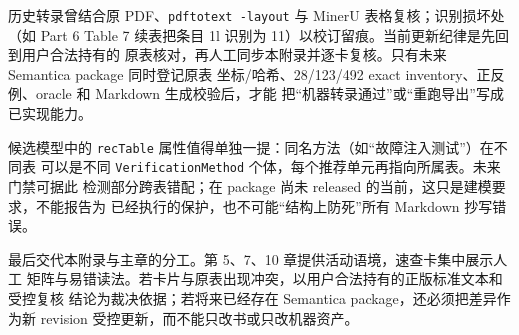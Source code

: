 历史转录曾结合原 PDF、\allowbreak{}\texttt{pdftotext \allowbreak{}-\allowbreak{}layout}\allowbreak{} 与 MinerU 表格复核；识别损坏处（如 Part 6
Table 7 续表把条目 1l 识别为 11）以校订留痕。当前更新纪律是先回到用户合法持有的
原表核对，再人工同步本附录并逐卡复核。只有未来 Semantica package 同时登记原表
坐标/哈希、28/123/492 exact inventory、正反例、oracle 和 Markdown 生成校验后，才能
把“机器转录通过”或“重跑导出”写成已实现能力。

候选模型中的 \nolinkurl{recTable} 属性值得单独一提：同名方法（如“故障注入测试”）在不同表
可以是不同 \nolinkurl{VerificationMethod} 个体，每个推荐单元再指向所属表。未来门禁可据此
检测部分跨表错配；在 package 尚未 released 的当前，这只是建模要求，不能报告为
已经执行的保护，也不可能“结构上防死”所有 Markdown 抄写错误。

最后交代本附录与主章的分工。第 5、7、10 章提供活动语境，速查卡集中展示人工
矩阵与易错读法。若卡片与原表出现冲突，以用户合法持有的正版标准文本和受控复核
结论为裁决依据；若将来已经存在 Semantica package，还必须把差异作为新 revision
受控更新，而不能只改书或只改机器资产。
